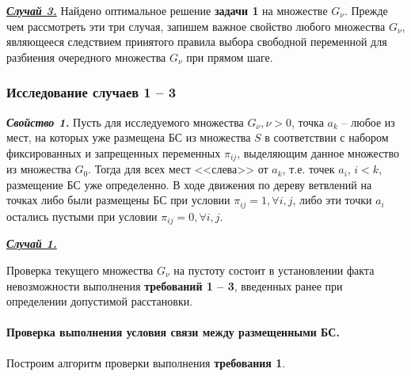 \underline{\textit{\textbf{Случай 3.}}} Найдено оптимальное решение \textbf{задачи 1} на множестве $G_\nu$.
Прежде чем рассмотреть эти три случая, запишем важное свойство любого множества $G_\nu$, являющееся следствием принятого правила выбора свободной переменной для разбиения очередного множества $G_\nu$ при прямом шаге. 



\subsubsection{Исследование случаев 1 – 3}

\textit{\textbf{Свойство 1.}} Пусть для исследуемого множества $G_\nu, \nu > 0$, точка $a_k$ -- любое из мест, на которых уже размещена БС из множества $S$ в соответствии с набором фиксированных и запрещенных переменных $\pi_{ij}$, выделяющим данное множество из множества $G_0$. Тогда для всех мест <<слева>> от $a_k$, т.е. точек $a_i$, $i<k$, размещение БС уже определенно. В ходе движения по дереву ветвлений на точках  либо были размещены БС при условии $\pi_{ij} =1 , \forall i, j$, либо эти точки $a_i$ остались пустыми при условии $\pi_{ij} =0 , \forall i, j$.

\underline{\textit{\textbf{Случай 1.}}}

Проверка текущего множества $G_\nu$ на пустоту состоит в установлении факта невозможности выполнения \textbf{требований 1 -- 3}, введенных ранее при определении допустимой расстановки.




\paragraph{Проверка выполнения условия связи между размещенными БС.}

Построим алгоритм проверки выполнения \textbf{требования 1}.



